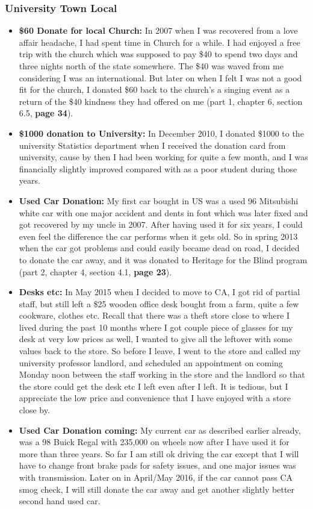 \documentclass[9pt,b5paper]{article}
\begin{document}
\subsubsection{University Town Local}
\label{sec-12-1-2}
\begin{itemize}
\item \textbf{\$60 Donate for local Church:} In 2007 when I was recovered from a love affair headache, I had spent time in Church for a while. I had enjoyed a free trip with the church which was supposed to pay \$40 to spend two days and three nights north of the state somewhere. The \$40 was waved from me considering I was an international. But later on when I felt I was not a good fit for the church, I donated \$60 back to the church's a singing event as a return of the \$40 kindness they had offered on me (part 1, chapter 6, section 6.5, \textbf{page 34}).
\item \textbf{\$1000 donation to University:} In December 2010, I donated \$1000 to the university Statistics department when I received the donation card from university, cause by then I had been working for quite a few month, and I was financially slightly improved compared with as a poor student during those years.
\item \textbf{Used Car Donation:} My first car bought in US was a used 96 Mitsubishi white car with one major accident and dents in font which was later fixed and got recovered by my uncle in 2007. After having used it for six years, I could even feel the difference the car performs when it gets old. So in spring 2013 when the car got problems and could easily became dead on road, I decided to donate the car away, and it was donated to Heritage for the Blind program (part 2, chapter 4, section 4.1, \textbf{page 23}).
\item \textbf{Desks etc:} In May 2015 when I decided to move to CA, I got rid of partial staff, but still left a \$25 wooden office desk bought from a farm, quite a few cookware, clothes etc. Recall that there was a theft store close to where I lived during the past 10 months where I got couple piece of glasses for my desk at very low prices as well, I wanted to give all the leftover with some values back to the store. So before I leave, I went to the store and called my university professor landlord, and scheduled an appointment on coming Monday noon between the staff working in the store and the landlord so that the store could get the desk etc I left even after I left. It is tedious, but I appreciate the low price and convenience that I have enjoyed with a store close by.
\item \textbf{Used Car Donation coming:} My current car as described earlier already, was a 98 Buick Regal with 235,000 on wheels now after I have used it for more than three years. So far I am still ok driving the car except that I will have to change front brake pads for safety issues, and one major issues was with transmission. Later on in April/May 2016, if the car cannot pass CA smog check, I will still donate the car away and get another slightly better second hand used car.
\end{itemize}
\end{document}
